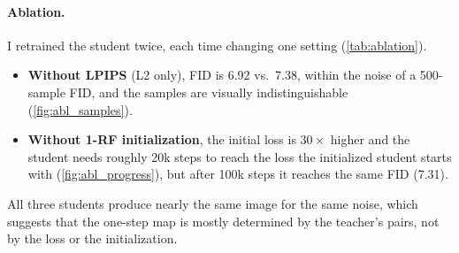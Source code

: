 \paragraph{Ablation.}
I retrained the student twice, each time changing one setting (\cref{tab:ablation}).
\begin{itemize}
  \item \textbf{Without LPIPS} (L2 only), FID is 6.92 vs.\ 7.38, within the noise of a 500-sample FID, and the samples are visually indistinguishable (\cref{fig:abl_samples}).
  \item \textbf{Without 1-RF initialization}, the initial loss is $30\times$ higher and the student needs roughly 20k steps to reach the loss the initialized student starts with (\cref{fig:abl_progress}), but after 100k steps it reaches the same FID (7.31).
\end{itemize}
All three students produce nearly the same image for the same noise, which suggests that the one-step map is mostly determined by the teacher's pairs, not by the loss or the initialization.

